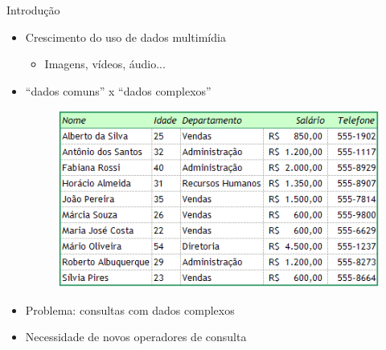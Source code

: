 \documentclass{beamer}
\begin{document}
\begin{frame}{Introdução}
  \begin{itemize}
    \item Crescimento do uso de dados multimídia
      \begin{itemize}
	\item Imagens, vídeos, áudio...\newline
      \end{itemize}
    \item ``dados comuns'' x ``dados complexos''\newline
	\begin{figure}[H]
			\centering
			\includegraphics[width=.5\textwidth]{dado_comum.png}
			\label{fig:dado_comum}
	\end{figure}

    \item Problema: consultas com dados complexos\newline
    \item Necessidade de novos operadores de consulta\newline
  \end{itemize}


\end{frame}
\end{document}
